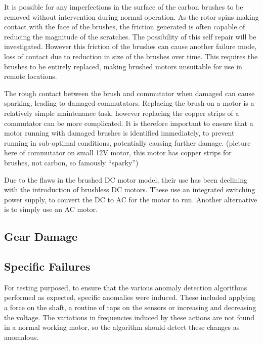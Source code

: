 It is possible for any imperfections in the surface of the carbon brushes to be removed without intervention during normal operation. As the rotor spins making contact with the face of the brushes, the friction generated is often capable of reducing the magnitude of the scratches. The possibility of this self repair will be investigated. However this friction of the brushes can cause another failure mode, loss of contact due to reduction in size of the brushes over time. This requires the brushes to be entirely replaced, making brushed motors unsuitable for use in remote locations. %

The rough contact between the brush and commutator when damaged can cause sparking, leading to damaged commutators. Replacing the brush on a motor is a relatively simple maintenance task, however replacing the copper strips of a commutator can be more complicated. It is therefore important to ensure that a motor running with damaged brushes is identified immediately, to prevent running in sub-optimal conditions, potentially causing further damage. (picture here of commutator on small 12V motor, this motor has copper strips for brushes, not carbon, so famously “sparky”)

Due to the flaws in the brushed DC motor model, their use has been declining with the introduction of brushless DC motors. These use an integrated switching power supply, to convert the DC to AC for the motor to run. Another alternative is to simply use an AC motor. 

\subsection{Gear Damage}


\subsection{Specific Failures}

For testing purposed, to ensure that the various anomaly detection algorithms performed as expected, specific anomalies were induced. These included applying a force on the shaft, a routine of taps on the sensors or increasing and decreasing the voltage. The variations in frequencies induced by these actions are not found in a normal working motor, so the algorithm should detect these changes as anomalous. 

